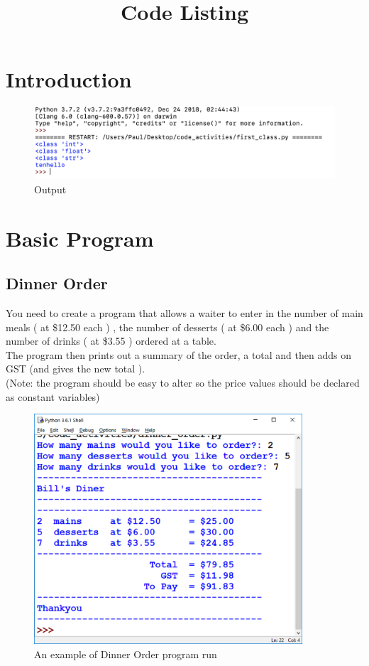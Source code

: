 \documentclass[a4paper,12pt]{article}
\title{Code Listing}
\date{ }
\begin{document}
\section{Introduction}


\begin{figure} [!h]
	\centering
	\includegraphics[width=18cm]{screen_shots/first_class.png}
	\caption*{Output}
\end{figure}
\newpage
\section{Basic Program}
\subsection{Dinner Order}
You need to create a program that allows a waiter to enter in the number of main meals ( at \$12.50 each ) , the number of desserts ( at \$6.00 each ) and the number of drinks ( at \$3.55 ) ordered at a table.\\
The program then prints out a summary of the order, a total and then adds on GST (and gives the new total ).\\
(Note: the program should be easy to alter so the price values should be declared as constant variables)


\begin{figure} [!h]
	\centering
	\includegraphics[width=10cm]{screen_shots/diner.png}
	\caption*{An example of Dinner Order program run}
\end{figure}
\end{document}
